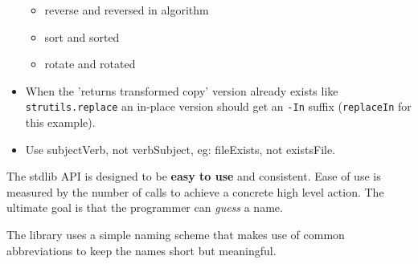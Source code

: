 \begin{itemize}
  \begin{itemize}
  \tightlist
  \item
    reverse and reversed in algorithm
  \item
    sort and sorted
  \item
    rotate and rotated
  \end{itemize}
\item
  When the 'returns transformed copy' version already exists like
  \texttt{strutils.replace} an in-place version should get an
  \texttt{-In} suffix (\texttt{replaceIn} for this example).
\item
  Use {subjectVerb}, not {verbSubject}, eg: {fileExists}, not
  {existsFile}.
\end{itemize}

The stdlib API is designed to be \textbf{easy to use} and consistent.
Ease of use is measured by the number of calls to achieve a concrete
high level action. The ultimate goal is that the programmer can
\emph{guess} a name.

The library uses a simple naming scheme that makes use of common
abbreviations to keep the names short but meaningful.

